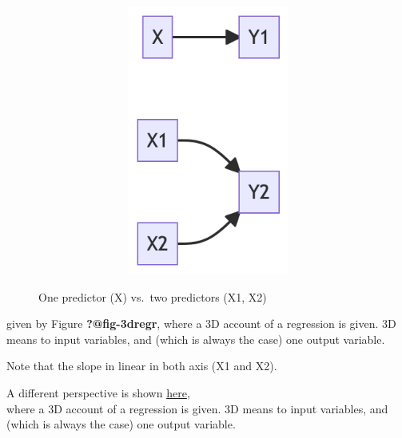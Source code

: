 \documentclass[
  letterpaper,
  DIV=11,
  numbers=noendperiod]{scrreprt}
\theoremstyle{definition}
\theoremstyle{definition}
\theoremstyle{remark}
\begin{document}
\begin{figure}

{\centering 

\begin{figure}[H]

{\centering \includegraphics[width=6.5in,height=3.5in]{./regression2_files/figure-latex/mermaid-figure-1.png}

}

\end{figure}

}

\caption{\label{fig-multregr}One predictor (X) vs.~two predictors (X1,
X2)}

\end{figure}

given by Figure \textbf{?@fig-3dregr}, where a 3D account of a
regression is given. 3D means to input variables, and (which is always
the case) one output variable.

\begin{tcolorbox}[enhanced jigsaw, bottomrule=.15mm, toprule=.15mm, coltitle=black, breakable, title=\textcolor{quarto-callout-note-color}{\faInfo}\hspace{0.5em}{Note}, leftrule=.75mm, colback=white, bottomtitle=1mm, toptitle=1mm, left=2mm, opacityback=0, titlerule=0mm, colbacktitle=quarto-callout-note-color!10!white, opacitybacktitle=0.6, colframe=quarto-callout-note-color-frame, rightrule=.15mm, arc=.35mm]
Note that the slope in linear in both axis (X1 and X2).
\end{tcolorbox}

A different perspective is shown
\href{https://upload.wikimedia.org/wikipedia/commons/a/ae/2d_multiple_linear_regression.gif?20161014061355}{here},\\
where a 3D account of a regression is given. 3D means to input
variables, and (which is always the case) one output variable.
\end{document}
